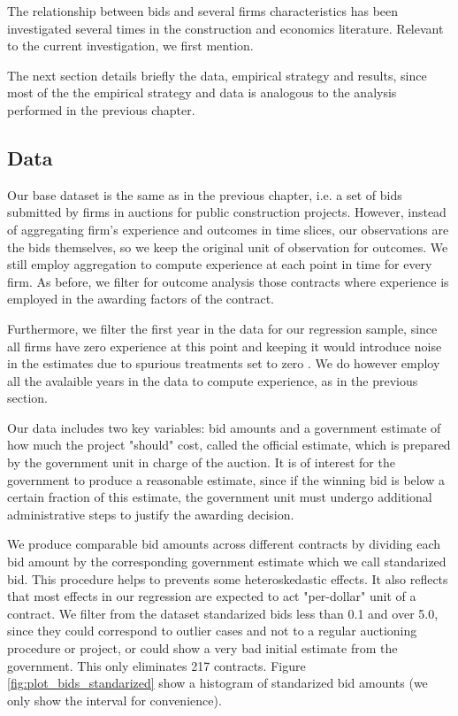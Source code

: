 The relationship between bids and several firms characteristics has been investigated several times in the construction and economics literature. Relevant to the current investigation, we first mention.

The next section details briefly the data, empirical strategy and results, since most of the the empirical strategy and data is analogous to the analysis performed in the previous chapter.

\subsection{Data}
Our base dataset is the same as in the previous chapter, i.e. a set of bids submitted by firms in auctions for public construction projects. However, instead of aggregating firm's experience and outcomes in time slices, our observations are the bids themselves, so we keep the original unit of observation for outcomes. We still employ aggregation to compute experience at each point in time for every firm. As before, we filter for outcome analysis those contracts where experience is employed in the awarding factors of the contract.

Furthermore, we filter the first year in the data for our regression sample, since all firms have zero experience at this point and keeping it would introduce noise in the estimates due to spurious treatments set to zero . We do however employ all the avalaible years in the data to compute experience, as in the previous section.

Our data includes two key variables: bid amounts and a government estimate of how much the project "should" cost, called the official estimate, which is prepared by the government unit in charge of the auction. It is of interest for the government to produce a reasonable estimate, since if the winning bid is below a certain fraction of this estimate, the government unit must undergo additional administrative steps to justify the awarding decision.

We produce comparable bid amounts across different contracts by dividing each bid amount by the corresponding government estimate which we call standarized bid. This procedure helps to prevents some heteroskedastic effects. It also reflects that most effects in our regression are expected to act "per-dollar" unit of a contract. We filter from the dataset standarized bids less than 0.1 and over 5.0, since they could correspond to outlier cases and not to a regular auctioning procedure or project, or could show a very bad initial estimate from the government. This only eliminates 217 contracts. Figure \ref{fig:plot_bids_standarized} show a histogram of standarized bid amounts (we only show the interval  for convenience).

